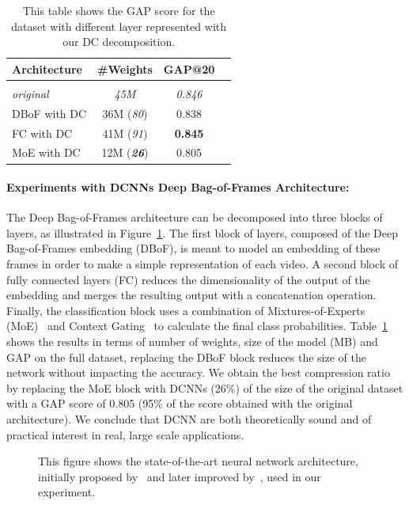 \begin{table}
  \centering
  \caption{This table shows the GAP score for the \yt dataset with different layer represented with our DC decomposition.}
  \begin{tabular}{lccc}
  \toprule
  \textbf{Architecture} & \textbf{\#Weights} & \textbf{GAP@20} \\
  \hline \\
  \textit{original} & \textit{45M} & \textit{0.846} \\
  DBoF with DC   & 36M (\textit{80}) & 0.838 \\
  FC with DC    & 41M (\textit{91}) & \textbf{0.845} \\
  MoE with DC   & 12M (\textit{\textbf{26}}) & 0.805 \\
  \hline
  \end{tabular}
  \label{table:youtube_full_xp}
\end{table}

\paragraph{Experiments with DCNNs Deep Bag-of-Frames Architecture:}
The Deep Bag-of-Frames architecture can be decomposed into three blocks of layers, as illustrated in Figure~\ref{figure:archi_youtube}.
The first block of layers, composed of the Deep Bag-of-Frames embedding (DBoF), is meant to model an embedding of these frames in order to make a simple representation of each video.
A second block of fully connected layers (FC) reduces the dimensionality of the output of the embedding and merges the resulting output with a concatenation operation.
Finally, the classification block uses a combination of Mixtures-of-Experts (MoE)~\cite{716791,abu2016youtube} and Context Gating~\cite{miech2017learnable} to calculate the final class probabilities.
Table~\ref{table:youtube_full_xp} shows the results in terms of number of weights, size of the model (MB) and GAP on the full dataset, replacing the DBoF block reduces the size of the network without impacting the accuracy.
We obtain the best compression ratio by replacing the MoE block with DCNNs (26\%) of the size of the original dataset with a GAP score of 0.805 (95\% of the score obtained with the original architecture).
We conclude that DCNN are both theoretically sound and of practical interest in real, large scale applications.

\begin{figure}[htb]
  \centering
  
  \caption{This figure shows the state-of-the-art neural network architecture, initially proposed by~\citet{abu2016youtube} and later improved by~\citet{miech2017learnable}, used in our experiment.}
  \label{figure:archi_youtube}
\end{figure}

